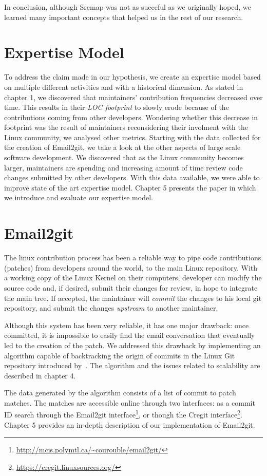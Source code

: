 In conclusion, although Srcmap was not as succeful as we originally hoped, we learned many important concepts that helped us in the rest of our research. 


\section{Expertise Model}
\label{sec:expertise_model}

To address the claim made in our hypothesis, we create an expertise model based on multiple different activities and with a historical dimension. As stated in chapter 1, we discovered that maintainers' contribution frequencies decreased over time. This results in their \textit{LOC footprint} to slowly erode because of the contributions coming from other developers. Wondering whether this decrease in footprint was the result of maintainers reconsidering their involment with the Linux community, we analysed other metrics. Starting with the data collected for the creation of Email2git, we take a look at the other aspects of large scale software development. We discovered that as the Linux community becomes larger, maintainers are spending and increasing amount of time review code changes submitted by other developers. With this data available, we were able to improve state of the art expertise model. Chapter 5 presents the paper in which we introduce and evaluate our expertise model. 






\section{Email2git}
\label{sec:email2git}

The linux contribution process has been a reliable way to pipe code contributions (patches) from developers around the world, to the main Linux repository. With a working copy of the Linux Kernel on their computers, developer can modify the source code and, if desired, submit their changes for review, in hope to integrate the main tree. If accepted, the maintainer will \textit{commit} the changes to his local git repository, and submit the changes \textit{upstream} to another maintainer. 

Although this system has been very reliable, it has one major drawback: once committed, it is impossible to easily find the email conversation that eventually led to the creation of the patch. We addressed this drawback by implementing an algorithm capable of backtracking the origin of commits in the Linux Git repository introduced by~\citep{jiang14}. The algorithm and the issues related to scalability are described in chapter 4.

The data generated by the algorithm consists of a list of commit to patch matches. The matches are accessible online through two interfaces: as a commit ID search through the Email2git interface\footnote{\url{http://mcis.polymtl.ca/~courouble/email2git/}}, or though the Cregit interface\footnote{\url{https://cregit.linuxsources.org/}}. Chapter 5 provides an in-depth description of our implementation of Email2git.





